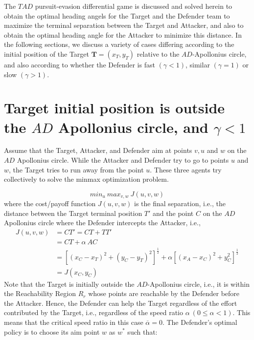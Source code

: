 The $TAD$ pursuit-evasion differential game is discussed and solved herein to obtain the optimal heading angels for the Target and the Defender team to maximize the terminal separation between the Target and Attacker, and also to obtain the optimal heading angle for the Attacker to minimize this distance. In the following sections, we discuss a variety of cases differing according to the initial position of the Target $\boldsymbol{T}=(x_T,y_T)$ relative to the $AD$-Apollonius circle, and also according to whether the Defender is fast $(\gamma<1)$, similar $(\gamma=1)$ or slow $(\gamma>1)$.

 
\section{Target initial position is outside the $AD$ Apollonius circle, and $\gamma<1$}

Assume that the Target, Attacker, and Defender aim at points $v, u$ and $w$ on the $AD$ Apollonius circle. While the Attacker and Defender try to go to points $u$ and $w$, the Target tries to run away from the point $u$. These three agents try collectively to solve the minmax optimization problem.

\begin{equation}
min_u\ max_{v,w}\ J(u,v,w)
\label{optimization prob}
\end{equation}  
where the cost/payoff function $J(u,v,w)$ is the final separation, i.e., the distance between the Target terminal position $T'$ and the point $C$ on the $AD$ Apollonius circle where the Defender intercepts the Attacker, i.e., 
\begin{equation}
\begin{split}
J(u,v,w) &= CT' = CT + TT' \\
&= CT +\alpha\ AC \\
&=[(x_C-x_T)^2+(y_C-y_T)^2]^{\frac{1}{2}}+\alpha[(x_A-x_C)^2+y_C^2]^{\frac{1}{2}} \\
&= J(x_C, y_C)
\end{split}
\label{costfn}
\end{equation} 
Note that the Target is initially outside the $AD$-Apollonius circle, i.e., it is within the Reachability Region $R_r$ whose points are reachable by the Defender before the Attacker. Hence, the Defender can help the Target regardless of the effort contributed by the Target, i.e., regardless of the speed ratio $\alpha\ (0\leq \alpha<1)$. This means that the critical speed ratio in this case $\overline{\alpha}=0$. The Defender's optimal policy is to choose its aim point $w$ as $w^*$ such that:

